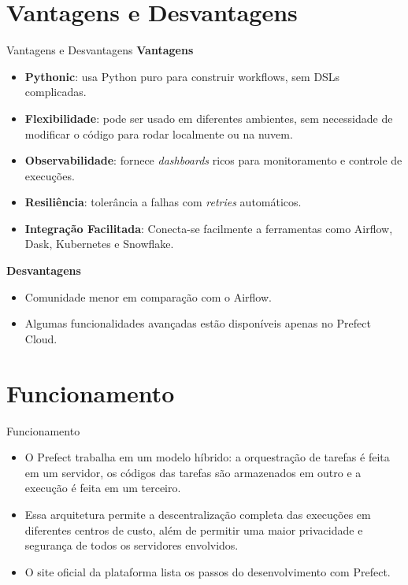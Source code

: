 \documentclass[t,serif]{beamer}
\begin{document}
\section{Vantagens e Desvantagens}
	\begin{frame}{Vantagens e Desvantagens}
		\textbf{Vantagens}
		\begin{itemize}
			\item \textbf{Pythonic}: usa Python puro para construir workflows, sem DSLs complicadas.
			\item \textbf{Flexibilidade}: pode ser usado em diferentes ambientes, sem necessidade de modificar o código para rodar localmente ou na nuvem.
			\item \textbf{Observabilidade}: fornece \textit{dashboards} ricos para monitoramento e controle de execuções.
			\item \textbf{Resiliência}: tolerância a falhas com \textit{retries} automáticos.
			\item \textbf{Integração Facilitada}: Conecta-se facilmente a ferramentas como Airflow, Dask, Kubernetes e Snowflake.
		\end{itemize}
		\textbf{Desvantagens}
		\begin{itemize}
			\item Comunidade menor em comparação com o Airflow.
			\item Algumas funcionalidades avançadas estão disponíveis apenas no Prefect Cloud.
		\end{itemize}
	\end{frame}
	
\section{Funcionamento}
	\begin{frame}{Funcionamento}
		\begin{itemize}
			\item O Prefect trabalha em um modelo híbrido: a orquestração de tarefas é feita em um servidor, os códigos das tarefas são armazenados em outro e a execução é feita em um terceiro.
			\vspace{0.5cm}
			\item Essa arquitetura permite a descentralização completa das execuções em diferentes centros de custo, além de permitir uma maior privacidade e segurança de todos os servidores envolvidos.
			\vspace{0.5cm}
			\item O site oficial da plataforma lista os passos do desenvolvimento com Prefect.
		\end{itemize}
	\end{frame}
	
\end{document}
